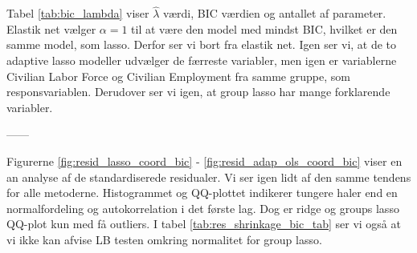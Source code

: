 
Tabel \ref{tab:bic_lambda} viser $\widehat{\lambda}$ værdi, BIC værdien og antallet af parameter. 
Elastik net vælger $\alpha =1$ til at være den model med mindst BIC, hvilket er den samme model, som lasso. 
Derfor ser vi bort fra elastik net. 
Igen ser vi, at de to adaptive lasso modeller udvælger de færreste variabler, men igen er variablerne Civilian Labor Force og Civilian Employment fra samme gruppe, som responsvariablen. 
Derudover ser vi igen, at group lasso har mange forklarende variabler. 

------ 

Figurerne \ref{fig:resid_lasso_coord_bic} - \ref{fig:resid_adap_ols_coord_bic} viser en an analyse af de standardiserede residualer.
Vi ser igen lidt af den samme tendens for alle metoderne. 
Histogrammet og QQ-plottet indikerer tungere haler end en normalfordeling og autokorrelation i det første lag. 
Dog er ridge og groups lasso QQ-plot kun med få outliers. 
I tabel \ref{tab:res_shrinkage_bic_tab} ser vi også at vi ikke kan afvise LB testen omkring normalitet for group lasso. 


%





